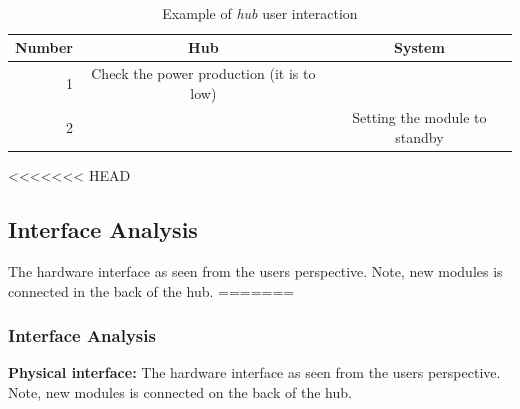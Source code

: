 		\\\begin{table}[h!]
					\begin{tabular}{| r | c | c |}
					\hline
					Number	& Hub				& System \\ \hline
					1		& Check the power production (it is to low)	& ~ \\ \hline
					2		& ~											& Setting the module to standby \\ \hline
					\end{tabular}
					\caption{Example of \textit{hub} user interaction}
				\end{table}	
<<<<<<< HEAD
	\subsection{Interface Analysis}
	The hardware interface as seen from the users perspective. Note, new modules is connected in the back of the hub.
=======
	\subsubsection{Interface Analysis}
	\textbf{Physical interface: } The hardware interface as seen from the users perspective. Note, new modules is connected on the back of the hub.
	
